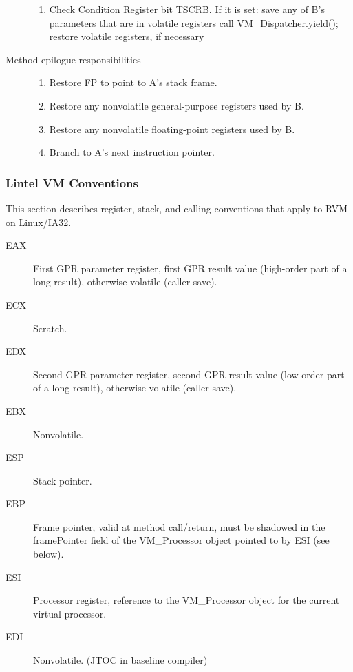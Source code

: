 \begin{description}
\begin{enumerate}
\item Check Condition Register bit TSCRB.  If it is set:
         save any of B's parameters that are in volatile registers
         call VM\_Dispatcher.yield();
         restore volatile registers, if necessary
\end{enumerate}

\item [Method epilogue responsibilities]

\begin{enumerate}
\item Restore FP to point to A's stack frame.

\item Restore any nonvolatile general-purpose registers used by B.

\item Restore any nonvolatile floating-point registers used by B.

\item Branch to A's next instruction pointer.
\end{enumerate}
\end{description}

\subsubsection{Lintel VM Conventions} \label{lintel-conventions}

This section describes register, stack, and calling conventions that apply to 
RVM on Linux/IA32.


\begin{description}
\item [EAX]
    First GPR parameter register, first GPR result value (high-order part
    of a long result), otherwise volatile (caller-save).

\item[ECX]
    Scratch.

\item[EDX]
    Second GPR parameter register, second GPR result value (low-order part
    of a long result), otherwise volatile (caller-save).

\item[EBX]
    Nonvolatile.

\item[ESP]
    Stack pointer.

\item[EBP]
    Frame pointer, valid at method call/return, must be shadowed in the
    framePointer field of the VM\_Processor object pointed to by ESI (see
    below).

\item[ESI]
    Processor register, reference to the VM\_Processor object for the current
    virtual processor.

\item[EDI]
    Nonvolatile.  (JTOC in baseline compiler)

\end{description}

